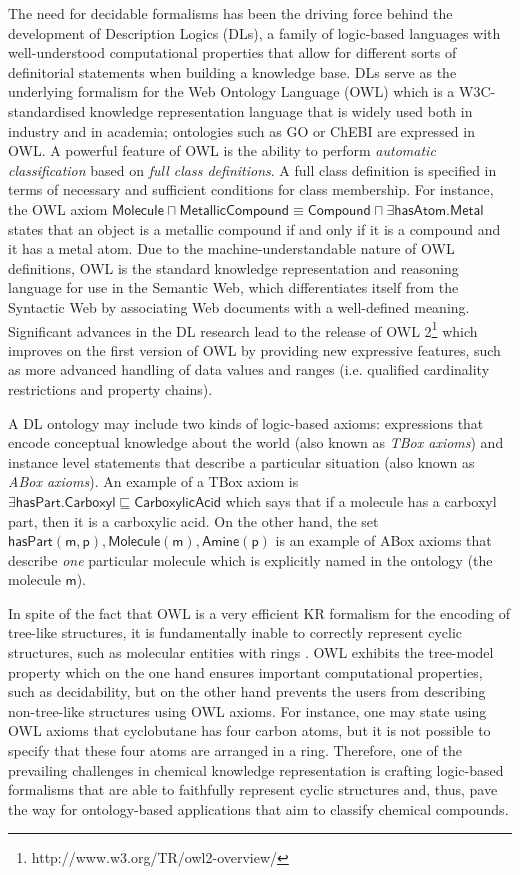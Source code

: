 \documentclass[10pt]{bmc_article}
\newenvironment{bmcformat}{\baselineskip20pt\sloppy\setboolean{publ}{false}}{\baselineskip20pt\sloppy}
\begin{document}
\begin{bmcformat}
The need for decidable formalisms has been the driving force behind the development of Description Logics (DLs), a family of logic-based languages with well-understood computational properties that allow for different sorts of definitorial statements when building a knowledge base. DLs serve as the underlying formalism for the Web Ontology Language (OWL) which is a W3C-standardised  knowledge representation language that is widely used both in industry and in academia; ontologies such as GO or ChEBI are expressed in OWL. A powerful feature of OWL is the ability to perform \emph{automatic classification} based on \emph{full class definitions}. A full class definition is specified in terms of necessary and sufficient conditions for class membership. For instance, the OWL axiom $\mathsf{Molecule \sqcap MetallicCompound} \equiv \mathsf{Compound \sqcap \exists hasAtom.Metal}$ states that an object is a metallic compound if and only if it is a compound and it has a metal atom. Due to the machine-understandable nature of OWL definitions, OWL is the standard knowledge representation and reasoning language for use in the Semantic Web, which differentiates itself from the Syntactic Web by associating Web documents with a well-defined meaning. Significant advances in the DL research lead to the release of OWL 2\footnote{http://www.w3.org/TR/owl2-overview/} which improves on the first version of OWL by providing new expressive features, such as more advanced handling of data values and ranges (i.e. qualified cardinality restrictions and property chains).

A DL ontology may include two kinds of logic-based axioms: expressions that encode conceptual knowledge about the world (also known as \emph{TBox axioms}) and instance level statements that describe a particular situation (also known as \emph{ABox axioms}). An example of a TBox axiom is $ \mathsf{ \exists hasPart.Carboxyl} \sqsubseteq \mathsf{CarboxylicAcid}$ which says that if a molecule has a carboxyl part, then it is a carboxylic acid. On the other hand, the set $\mathsf{hasPart(m,p),Molecule(m),Amine(p)}$ is an example of ABox axioms that describe \emph{one} particular molecule which is explicitly named in the ontology (the molecule $\mathsf{m}$).

In spite of the fact that OWL is a very efficient KR formalism for the encoding of tree-like structures, it is fundamentally inable to correctly represent cyclic structures, such as molecular entities with rings \cite{magka2010}. OWL exhibits the tree-model property \cite{VardiModalLogic} which on the one hand ensures important computational properties, such as decidability, but on the other hand prevents the users from describing  non-tree-like structures using OWL axioms. For instance, one may state using OWL axioms that cyclobutane has four carbon atoms, but it is not possible to specify that these four atoms are arranged in a ring. Therefore, one of the prevailing challenges in chemical knowledge representation is crafting logic-based formalisms that are able to faithfully represent cyclic structures and, thus, pave the way for ontology-based applications that aim to classify chemical compounds.


\end{bmcformat}
\end{document}
